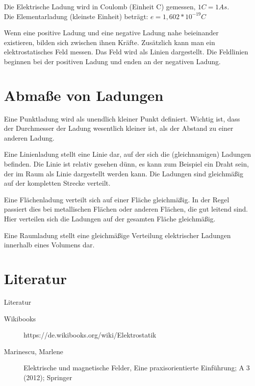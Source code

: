 \documentclass[a4paper]{article}
\begin{document}
  Die Elektrische Ladung wird in Coulomb (Einheit C) gemessen, $1 C = 1 As$. \\ Die Elementarladung (kleinste Einheit) beträgt: $e = 1,602 * 10^{-19} C$

  Wenn eine positive Ladung und eine negative Ladung nahe beieinander existieren, bilden sich zwischen ihnen Kräfte. Zusätzlich kann man ein elektrostatisches Feld messen. Das Feld wird als Linien dargestellt. Die Feldlinien beginnen bei der positiven Ladung und enden an der negativen Ladung.

  \section{Abmaße von Ladungen}
  Eine Punktladung wird als unendlich kleiner Punkt definiert. Wichtig ist, dass der Durchmesser der Ladung wesentlich kleiner ist, als der Abstand zu einer anderen Ladung.

  Eine Linienladung stellt eine Linie dar, auf der sich die (gleichnamigen) Ladungen befinden. Die Linie ist relativ gesehen dünn, es kann zum Beispiel ein Draht sein, der im Raum als Linie dargestellt werden kann. Die Ladungen sind gleichmäßig auf der kompletten Strecke verteilt.

  Eine Flächenladung verteilt sich auf einer Fläche gleichmäßig. In der Regel passiert dies bei metallischen Flächen oder anderen Flächen, die gut leitend sind. Hier verteilen sich die Ladungen auf der gesamten Fläche gleichmäßig.

  Eine Raumladung stellt eine gleichmäßige Verteilung elektrischer Ladungen innerhalb eines Volumens dar.



  \section{Literatur}
  \begin{frame}{Literatur}
  \begin{description}
   \item[Wikibooks] https://de.wikibooks.org/wiki/Elektrostatik
   \item[Marinescu, Marlene]  Elektrische und magnetische Felder,
   Eine praxisorientierte Einführung; A 3 (2012); Springer
  \end{description}
  \end{frame}


















  \listoffigures
  \listoftables


  \label{LastPage}
\end{document}
